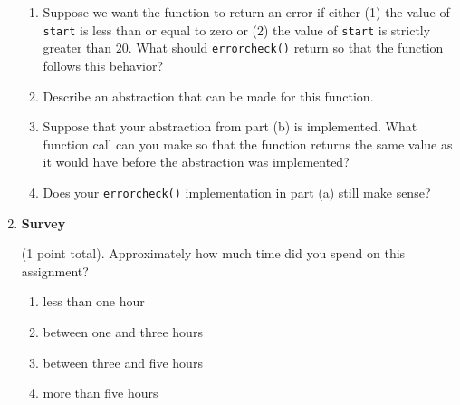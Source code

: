 \documentclass{article}
\newcounter{points}
\newcommand\printpoints{Total number of points: \thepoints}
\begin{document}
\begin{enumerate}


\begin{enumerate}
\item Suppose we want the function to return an error if either (1) the value of \texttt{start} is less than or equal to zero or (2) the value of \texttt{start} is strictly greater than $20$.  What should \texttt{errorcheck()} return so that the function follows this behavior?
\end{enumerate}

\begin{enumerate}
\setcounter{enumii}{1}
\item Describe an abstraction that can be made for this function.
\end{enumerate}

\begin{enumerate}
\setcounter{enumii}{2}
\item Suppose that your abstraction from part (b) is implemented.  What function call can you make so that the function returns the same value as it would have before the abstraction was implemented?
\end{enumerate}

\begin{enumerate}
\setcounter{enumii}{3}
\item Does your \texttt{errorcheck()} implementation in part (a) still make sense?
\end{enumerate}

\item \textbf{Survey}

(1 point total).  Approximately how much time did you spend on this assignment?
\begin{enumerate}
\item less than one hour
\end{enumerate}

\begin{enumerate}
\setcounter{enumii}{1}
\item between one and three hours
\end{enumerate}

\begin{enumerate}
\setcounter{enumii}{2}
\item between three and five hours
\end{enumerate}

\begin{enumerate}
\setcounter{enumii}{3}
\item more than five hours
\end{enumerate}

\end{enumerate}
\end{document}
